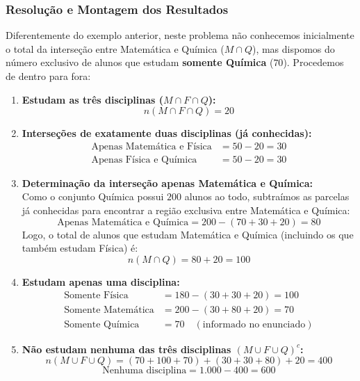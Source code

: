 \subsubsection*{Resolução e Montagem dos Resultados}

Diferentemente do exemplo anterior, neste problema não conhecemos inicialmente o total da interseção entre Matemática e Química ($M \cap Q$), mas dispomos do número exclusivo de alunos que estudam \textbf{somente Química} ($70$). Procedemos de dentro para fora:

\begin{enumerate}
    \item \textbf{Estudam as três disciplinas ($M \cap F \cap Q$):}
    \[
    n(M \cap F \cap Q) = 20
    \]

    \item \textbf{Interseções de exatamente duas disciplinas (já conhecidas):}
    \begin{align*}
    \text{Apenas Matemática e Física} &= 50 - 20 = 30 \\
    \text{Apenas Física e Química} &= 50 - 20 = 30
    \end{align*}

    \item \textbf{Determinação da interseção apenas Matemática e Química:} \\
    Como o conjunto Química possui $200$ alunos ao todo, subtraímos as parcelas já conhecidas para encontrar a região exclusiva entre Matemática e Química:
    \[
    \text{Apenas Matemática e Química} = 200 - (70 + 30 + 20) = 80
    \]
    Logo, o total de alunos que estudam Matemática e Química (incluindo os que também estudam Física) é:
    \[
    n(M \cap Q) = 80 + 20 = 100
    \]

    \item \textbf{Estudam apenas uma disciplina:}
    \begin{align*}
    \text{Somente Física} &= 180 - (30 + 30 + 20) = 100 \\
    \text{Somente Matemática} &= 200 - (30 + 80 + 20) = 70 \\
    \text{Somente Química} &= 70 \quad (\text{informado no enunciado})
    \end{align*}

    \item \textbf{Não estudam nenhuma das três disciplinas $(M \cup F \cup Q)^c$:}
    \[
    n(M \cup F \cup Q) = (70 + 100 + 70) + (30 + 30 + 80) + 20 = 400
    \]
    \[
    \text{Nenhuma disciplina} = 1.000 - 400 = 600
    \]
\end{enumerate}

